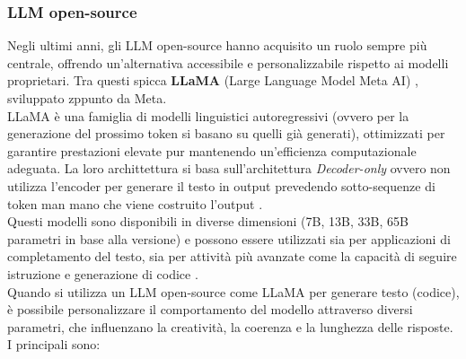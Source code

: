 \documentclass{article}
\begin{document}
\subsubsection{LLM open-source}
Negli ultimi anni, gli LLM open-source hanno acquisito un ruolo sempre più centrale, offrendo un’alternativa accessibile e personalizzabile rispetto ai modelli proprietari. Tra questi spicca \textbf{LLaMA} (Large Language Model Meta AI) \cite{journals/corr/abs-2302-13971}, sviluppato zppunto da Meta.\\
LLaMA è una famiglia di modelli linguistici autoregressivi (ovvero per la generazione del prossimo token si basano su quelli già generati), ottimizzati per garantire prestazioni elevate pur mantenendo un’efficienza computazionale adeguata. La loro archittettura si basa sull'architettura \textit{Decoder-only} ovvero non utilizza l'encoder per generare il testo in output prevedendo sotto-sequenze di token man mano che viene costruito l'output \cite{hou2024large}.\\
Questi modelli sono disponibili in diverse dimensioni (7B, 13B, 33B, 65B parametri in base alla versione) e possono essere utilizzati sia per applicazioni di completamento del testo, sia per attività più avanzate come la capacità di seguire istruzione e generazione di codice \cite{hou2024large}.\\
Quando si utilizza un LLM open-source come LLaMA per generare testo (codice), è possibile personalizzare il comportamento del modello attraverso diversi parametri, che influenzano la creatività, la coerenza e la lunghezza delle risposte. I principali sono:
\end{document}

